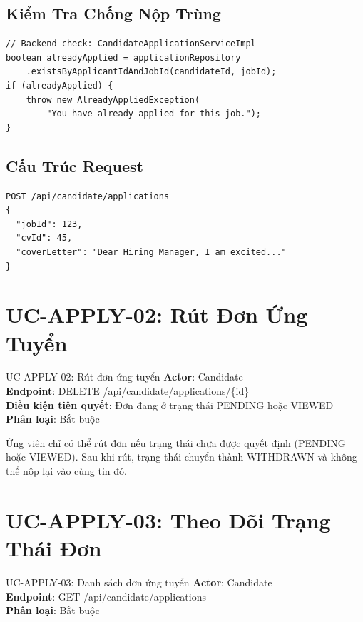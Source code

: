 \documentclass[12pt, a4paper]{report}
\begin{document}
\subsection{Kiểm Tra Chống Nộp Trùng}

\begin{lstlisting}[style=javastyle, caption=Logic kiểm tra nộp trùng]
// Backend check: CandidateApplicationServiceImpl
boolean alreadyApplied = applicationRepository
    .existsByApplicantIdAndJobId(candidateId, jobId);
if (alreadyApplied) {
    throw new AlreadyAppliedException(
        "You have already applied for this job.");
}
\end{lstlisting}

\subsection{Cấu Trúc Request}

\begin{lstlisting}[style=javastyle]
POST /api/candidate/applications
{
  "jobId": 123,
  "cvId": 45,
  "coverLetter": "Dear Hiring Manager, I am excited..."
}
\end{lstlisting}

\section{UC-APPLY-02: Rút Đơn Ứng Tuyển}

\begin{requirementbox}{UC-APPLY-02: Rút đơn ứng tuyển}
\textbf{Actor}: Candidate \\
\textbf{Endpoint}: DELETE /api/candidate/applications/\{id\} \\
\textbf{Điều kiện tiên quyết}: Đơn đang ở trạng thái PENDING hoặc VIEWED \\
\textbf{Phân loại}: Bắt buộc
\end{requirementbox}

Ứng viên chỉ có thể rút đơn nếu trạng thái chưa được quyết định (PENDING hoặc VIEWED). Sau khi rút, trạng thái chuyển thành WITHDRAWN và không thể nộp lại vào cùng tin đó.

\section{UC-APPLY-03: Theo Dõi Trạng Thái Đơn}

\begin{requirementbox}{UC-APPLY-03: Danh sách đơn ứng tuyển}
\textbf{Actor}: Candidate \\
\textbf{Endpoint}: GET /api/candidate/applications \\
\textbf{Phân loại}: Bắt buộc
\end{requirementbox}
\end{document}
